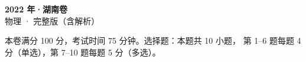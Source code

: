 \documentclass[zihao=-4, a4paper]{ctexart}
\begin{document}
\setlength{\abovedisplayskip}{5pt plus 2pt minus 2pt}
\setlength{\belowdisplayskip}{5pt plus 2pt minus 2pt}
\setlength{\abovedisplayshortskip}{2pt plus 1pt}
\setlength{\belowdisplayshortskip}{3pt plus 1pt minus 1pt}
\begin{center}
  {\Large\bfseries 2022 年·湖南卷}\\[4pt]
  {\large 物理 · 完整版（含解析）}
\end{center}
\medskip
\begin{gknotice}
  本卷满分 100 分，考试时间 75 分钟。选择题：本题共 10 小题，
  第 1--6 题每题 4 分（单选），第 7--10 题每题 5 分（多选）。
\end{gknotice}

\clearpage
{}

\clearpage
{}

\end{document}
